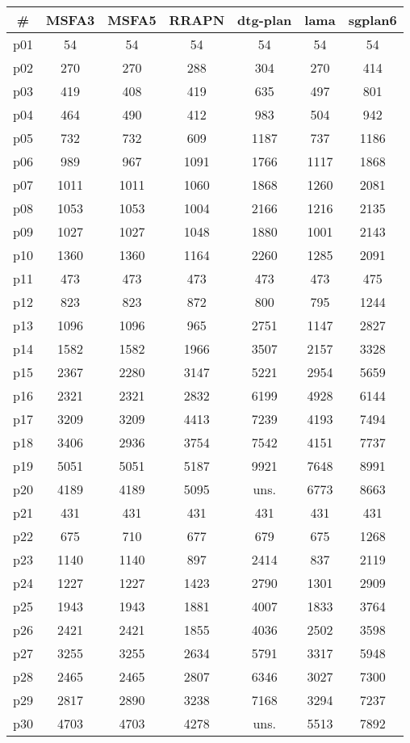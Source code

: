 \begin{tabular}{c||c|c|c|c|c|c}
\textbf{\#} & \textbf{MSFA3} & \textbf{MSFA5} & \textbf{RRAPN} & \textbf{dtg-plan} & \textbf{lama} & \textbf{sgplan6}\\
\hline
\hline
p01 & 54 & 54 & 54 & 54 & 54 & 54\\
p02 & 270 & 270 & 288 & 304 & 270 & 414\\
p03 & 419 & 408 & 419 & 635 & 497 & 801\\
p04 & 464 & 490 & 412 & 983 & 504 & 942\\
p05 & 732 & 732 & 609 & 1187 & 737 & 1186\\
p06 & 989 & 967 & 1091 & 1766 & 1117 & 1868\\
p07 & 1011 & 1011 & 1060 & 1868 & 1260 & 2081\\
p08 & 1053 & 1053 & 1004 & 2166 & 1216 & 2135\\
p09 & 1027 & 1027 & 1048 & 1880 & 1001 & 2143\\
p10 & 1360 & 1360 & 1164 & 2260 & 1285 & 2091\\
p11 & 473 & 473 & 473 & 473 & 473 & 475\\
p12 & 823 & 823 & 872 & 800 & 795 & 1244\\
p13 & 1096 & 1096 & 965 & 2751 & 1147 & 2827\\
p14 & 1582 & 1582 & 1966 & 3507 & 2157 & 3328\\
p15 & 2367 & 2280 & 3147 & 5221 & 2954 & 5659\\
p16 & 2321 & 2321 & 2832 & 6199 & 4928 & 6144\\
p17 & 3209 & 3209 & 4413 & 7239 & 4193 & 7494\\
p18 & 3406 & 2936 & 3754 & 7542 & 4151 & 7737\\
p19 & 5051 & 5051 & 5187 & 9921 & 7648 & 8991\\
p20 & 4189 & 4189 & 5095 & uns. & 6773 & 8663\\
p21 & 431 & 431 & 431 & 431 & 431 & 431\\
p22 & 675 & 710 & 677 & 679 & 675 & 1268\\
p23 & 1140 & 1140 & 897 & 2414 & 837 & 2119\\
p24 & 1227 & 1227 & 1423 & 2790 & 1301 & 2909\\
p25 & 1943 & 1943 & 1881 & 4007 & 1833 & 3764\\
p26 & 2421 & 2421 & 1855 & 4036 & 2502 & 3598\\
p27 & 3255 & 3255 & 2634 & 5791 & 3317 & 5948\\
p28 & 2465 & 2465 & 2807 & 6346 & 3027 & 7300\\
p29 & 2817 & 2890 & 3238 & 7168 & 3294 & 7237\\
p30 & 4703 & 4703 & 4278 & uns. & 5513 & 7892\\
\end{tabular}

